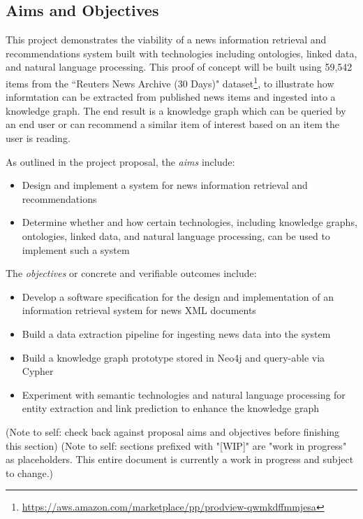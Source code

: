 \documentclass[11pt]{article}
\begin{document}
\subsection{Aims and Objectives}
This project demonstrates the viability of a news information retrieval and recommendations system built with technologies including ontologies, linked data, and natural language processing. This proof of concept will be built using 59,542 items from the ``Reuters News Archive (30 Days)" dataset\footnote{\url{https://aws.amazon.com/marketplace/pp/prodview-qwmkdffmmjesa}}, to illustrate how informtation can be extracted from published news items and ingested into a knowledge graph. The end result is a knowledge graph which can be queried by an end user or can recommend a similar item of interest based on an item the user is reading.

As outlined in the project proposal\cite{ek-proposal}, the \textit{aims} include:
\begin{itemize}
  \item Design and implement a system for news information retrieval and recommendations
  \item Determine whether and how certain technologies, including knowledge graphs, ontologies, linked data, and natural language processing, can be used to implement such a system
\end{itemize}

The \textit{objectives} or concrete and verifiable outcomes include:
\begin{itemize}
  \item Develop a software specification for the design and implementation of an information retrieval system for news XML documents
  \item Build a data extraction pipeline for ingesting news data into the system
  \item Build a knowledge graph prototype stored in Neo4j and query-able via Cypher
  \item Experiment with semantic technologies and natural language processing for entity extraction and link prediction to enhance the knowledge graph
\end{itemize}

(Note to self: check back against proposal aims and objectives before finishing this section)
(Note to self: sections prefixed with "[WIP]" are "work in progress" as placeholders. This entire document is currently a work in progress and subject to change.)

\newpage
\end{document}
